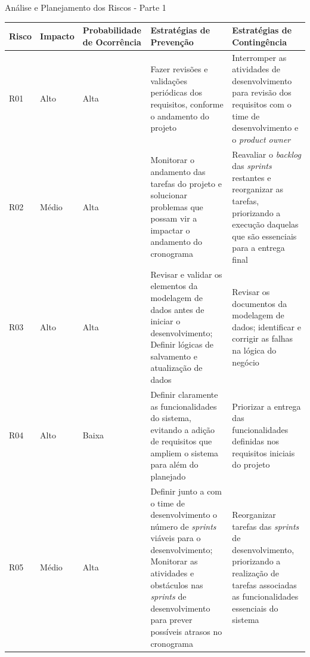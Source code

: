 \documentclass[
	12pt,				%
	openany,			%
	twoside,			%
	a4paper,			%
	english,			%
	french,				%
	spanish,			%
	brazil				%
	]{abntex2}
\begin{document}
 
 \begin{quadro}[H]
 	\caption{Análise e Planejamento dos Riscos - Parte 1}
 	 \label{analise_riscos_1} 
 	 \begin{tabular} {|p{1cm}|p{1.6cm}|p{3cm}|p{4.7cm}|p{4.7cm}|}
 		\hline
 		\textbf{Risco} & \textbf{Impacto} & \textbf{Probabilidade de  Ocorrência} & \textbf{Estratégias de \newline Prevenção} & \textbf{Estratégias de \newline Contingência}\\
 		\hline
 	 	R01 & Alto & Alta &
	 	Fazer revisões e validações periódicas dos requisitos, conforme o andamento do projeto  & Interromper as atividades de desenvolvimento para revisão dos requisitos com o time de desenvolvimento e o \textit{product owner}\\
	 	\hline
	 	R02 & Médio & Alta &
	 	Monitorar o andamento das tarefas do projeto e solucionar problemas que possam vir a impactar o andamento do cronograma  & Reavaliar o \textit {backlog} das \textit{sprints} restantes e reorganizar as tarefas, priorizando a execução daquelas que são essenciais para a entrega final \\
	 	\hline
	 	R03 & Alto & Alta &
	 	Revisar e validar os elementos da modelagem de dados antes de iniciar o desenvolvimento; Definir lógicas de salvamento e atualização de dados  & Revisar os documentos da modelagem de dados;  identificar e corrigir as falhas na lógica do negócio \\
	 	\hline
	 	R04 & Alto & Baixa &
	 	Definir claramente as funcionalidades do sistema, evitando a adição de requisitos que ampliem o sistema para além do planejado  & Priorizar a entrega das funcionalidades definidas nos requisitos iniciais do projeto \\
	 	\hline
	 	R05 & Médio & 	Alta &
	 	Definir junto a com o time de desenvolvimento o número de \textit{sprints} viáveis para o desenvolvimento; Monitorar as atividades e obstáculos nas \textit{sprints} de desenvolvimento para prever possíveis atrasos no cronograma & Reorganizar tarefas das \textit{sprints} de desenvolvimento, priorizando a realização de tarefas associadas as funcionalidades essenciais do sistema \\
	 	\hline
	\end{tabular}
	 	\end{quadro}
\end{document}
